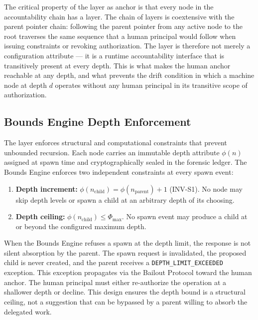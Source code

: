 The critical property of the \purpose{} layer as anchor is that every node in the accountability chain has a \purpose{} layer. The chain of \purpose{} layers is coextensive with the parent pointer chain: following the parent pointer from any active node to the root traverses the same sequence that a human principal would follow when issuing constraints or revoking authorization. The \purpose{} layer is therefore not merely a configuration attribute — it is a runtime accountability interface that is transitively present at every depth. This is what makes the human anchor reachable at any depth, and what prevents the drift condition in which a machine node at depth $d$ operates without any human principal in its transitive scope of authorization.

\subsection{Bounds Engine Depth Enforcement}
\label{sec:bounds-engine-depth}

The \bounds{} layer enforces structural and computational constraints that prevent unbounded recursion. Each node carries an immutable depth attribute $\phi(n)$ assigned at spawn time and cryptographically sealed in the forensic ledger. The Bounds Engine enforces two independent constraints at every spawn event:

\begin{enumerate}
    \item \textbf{Depth increment:} $\phi(n_{\text{child}}) = \phi(n_{\text{parent}}) + 1$ (INV-S1). No node may skip depth levels or spawn a child at an arbitrary depth of its choosing.
    \item \textbf{Depth ceiling:} $\phi(n_{\text{child}}) \leq \Phi_{\max}$. No spawn event may produce a child at or beyond the configured maximum depth.
\end{enumerate}

When the Bounds Engine refuses a spawn at the depth limit, the response is not silent absorption by the parent. The spawn request is invalidated, the proposed child is never created, and the parent receives a \texttt{DEPTH\_LIMIT\_EXCEEDED} exception. This exception propagates via the Bailout Protocol toward the human anchor. The human principal must either re-authorize the operation at a shallower depth or decline. This design ensures the depth bound is a structural ceiling, not a suggestion that can be bypassed by a parent willing to absorb the delegated work.

